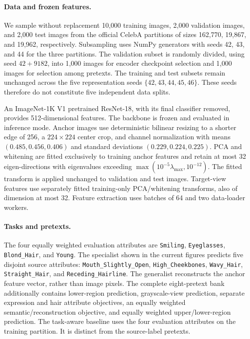 \paragraph{Data and frozen features.}
We sample without replacement 10,000 training images, 2,000 validation images,
and 2,000 test images from the official CelebA partitions of sizes
162,770, 19,867, and 19,962, respectively. Subsampling uses NumPy generators
with seeds 42, 43, and 44 for the three partitions. The validation subset
is randomly divided, using seed $42+9182$, into 1,000 images for encoder
checkpoint selection and 1,000 images for selection among pretexts. The
training and test subsets remain unchanged across the five representation
seeds $\{42,43,44,45,46\}$. These seeds therefore do not constitute five
independent data splits.

An ImageNet-1K V1 pretrained ResNet-18, with its final classifier removed,
provides 512-dimensional features. The backbone is frozen and evaluated in
inference mode. Anchor images use deterministic bilinear resizing to a shorter edge of 256,
a $224\times224$ center crop, and channel normalization with means
$(0.485,0.456,0.406)$ and standard deviations $(0.229,0.224,0.225)$. PCA and whitening are fitted exclusively to training
anchor features and retain at most 32 eigen-directions with eigenvalues
exceeding $\max(10^{-5}\lambda_{\max},10^{-12})$. The fitted transform is
applied unchanged to validation and test images. Target-view features use
separately fitted training-only PCA/whitening transforms, also of dimension
at most 32. Feature extraction uses batches of 64 and two data-loader workers.

\paragraph{Tasks and pretexts.}
The four equally weighted evaluation attributes are \texttt{Smiling},
\texttt{Eyeglasses}, \texttt{Blond\_Hair}, and \texttt{Young}. The specialist
shown in the current figures predicts five disjoint source attributes:
\texttt{Mouth\_Slightly\_Open}, \texttt{High\_Cheekbones},
\texttt{Wavy\_Hair}, \texttt{Straight\_Hair}, and
\texttt{Receding\_Hairline}. The generalist reconstructs the anchor feature
vector, rather than image pixels. The complete eight-pretext bank additionally
contains lower-region prediction, grayscale-view prediction, separate
expression and hair attribute objectives, an equally weighted
semantic/reconstruction objective, and equally weighted upper/lower-region
prediction. The task-aware baseline uses the four evaluation attributes
on the training partition. It is distinct from the source-label pretexts.

